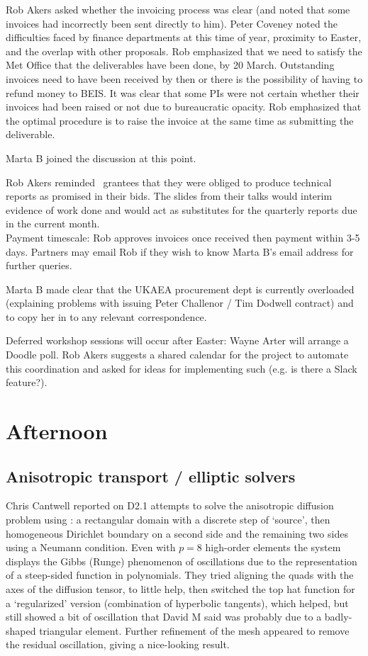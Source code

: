 Rob Akers asked whether the invoicing process was clear (and noted that some 
invoices had incorrectly been sent directly to him).  Peter Coveney noted the 
difficulties faced by finance departments at this time of year, proximity to 
Easter, and the overlap with other proposals.  Rob emphasized that we need to 
satisfy the Met Office that the deliverables have been done, by 20 March.  
Outstanding invoices need to have been received by then or there is the 
possibility of having to refund money to BEIS.  It was clear that some PIs were 
not certain whether their invoices had been raised or not due to bureaucratic 
opacity.  Rob emphasized that the optimal procedure is to raise the invoice at 
the same time as submitting the deliverable.

Marta B joined the discussion at this point.

Rob Akers reminded \nep\ grantees that they were obliged to produce technical reports as
promised in their bids. The slides from their talks would interim evidence of 
work done and would act as substitutes for the  quarterly reports
due in the current month. \\
Payment timescale: Rob approves invoices once 
received then payment within 3-5 days.  Partners may email Rob if they wish to 
know Marta B's email address for further queries.

Marta B made clear that the UKAEA procurement dept is currently overloaded 
(explaining problems with issuing Peter Challenor / Tim Dodwell contract) and 
to copy her in to any relevant correspondence.

Deferred workshop sessions will occur after Easter: Wayne Arter will arrange a 
Doodle poll.  Rob Akers suggests a shared calendar for the project to automate 
this coordination and asked for ideas for implementing such (e.g. is there a 
Slack feature?).

\section{Afternoon}

\subsection{Anisotropic transport / elliptic solvers}

Chris Cantwell reported on D2.1 attempts to solve the anisotropic diffusion 
problem using : a rectangular domain with a discrete step of 
`source', then homogeneous Dirichlet boundary on a second side and the 
remaining two sides using a Neumann condition.  Even with $p=8$ high-order 
elements the system displays the Gibbs (Runge) phenomenon of oscillations due 
to the representation of a steep-sided function in polynomials.  They tried 
aligning the quads with the axes of the diffusion tensor, to little help, then 
switched the top hat function for a `regularized' version (combination of 
hyperbolic tangents), which helped, but still showed a bit of oscillation that 
David M said was probably due to a badly-shaped triangular element.  Further 
refinement of the mesh appeared to remove the residual oscillation, giving a 
nice-looking result.


